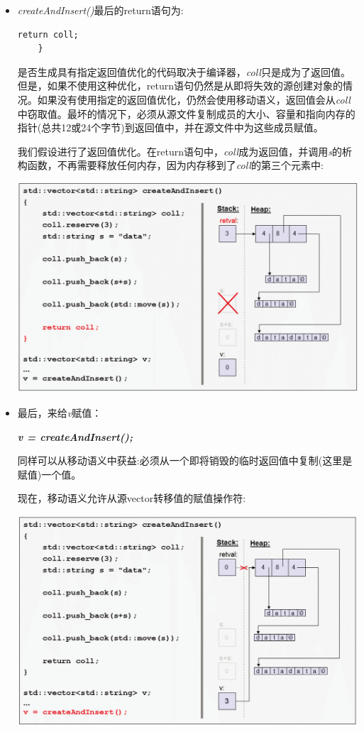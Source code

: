 \begin{itemize}
	\item \textit{createAndInsert()}最后的return语句为:\par
	\begin{lstlisting}[caption={}]
		return coll;
	}
	\end{lstlisting}
	是否生成具有指定返回值优化的代码取决于编译器，\textit{coll}只是成为了返回值。但是，如果不使用这种优化，return语句仍然是从即将失效的源创建对象的情况。如果没有使用指定的返回值优化，仍然会使用移动语义，返回值会从\textit{coll}中窃取值。最坏的情况下，必须从源文件复制成员的大小、容量和指向内存的指针(总共12或24个字节)到返回值中，并在源文件中为这些成员赋值。\par
	我们假设进行了返回值优化。在return语句中，\textit{coll}成为返回值，并调用\textit{s}的析构函数，不再需要释放任何内存，因为内存移到了\textit{coll}的第三个元素中:\par
	\begin{center}
		\includegraphics[width=1.0\textwidth]{content/1/chapter1/images/15}
	\end{center}
	\item 最后，来给\textit{v}赋值：\par
	\textit{\textbf{v = createAndInsert();}}\par
	同样可以从移动语义中获益:必须从一个即将销毁的临时返回值中复制(这里是赋值)一个值。\par
	现在，移动语义允许从源vector转移值的赋值操作符:\par
	\begin{center}
		\includegraphics[width=1.0\textwidth]{content/1/chapter1/images/16}

\end{center}
\end{itemize}
